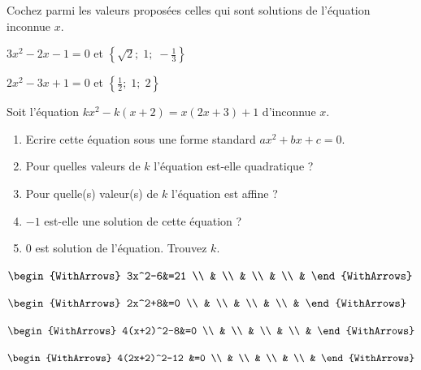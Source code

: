\documentclass[main.tex]{subfiles}
\begin{document}
\begin{exercise}Cochez parmi les valeurs proposées celles qui sont solutions de l'équation inconnue $x$.
	
\noindent
\parbox{0.45\linewidth}{
\noindent $3x^2-2x-1=0$ et $\left\{\sqrt{2}; \; 1; \; -\frac{1}{3}\right\}$
}
\hfill
\parbox{0.45\linewidth}{
\noindent $2x^2-3x+1=0$ et $\left\{\frac{1}{2}; \; 1; \; 2\right\}$
}
\end{exercise}
\begin{exercise} Soit l'équation $kx^2-k(x+2)=x(2x+3)+1$ d'inconnue $x$.
	\begin{enumerate}[label=\alph*), leftmargin=*]
		\item Ecrire cette équation sous une forme standard $a x^2+bx + c=0$.
		\item Pour quelles valeurs de $k$ l'équation est-elle quadratique ? 	
		\item Pour quelle(s) valeur(s) de $k$ l'équation est affine ?
		\item $-1$ est-elle une solution de cette équation ?
		\item $0$ est solution de l'équation. Trouvez $k$.
	\end{enumerate}
\end{exercise}	 
%
\begin{example}  
	
\noindent
\parbox{0.20\linewidth}{
	\noindent
	$\begin{WithArrows}
		3x^2-6&=21  \\
		&    \\
		&  \\
		&  \\
		&  
	\end{WithArrows}$
} 
\parbox{0.20\linewidth}{
	\noindent
	$\begin{WithArrows}
		2x^2+8&=0 \\
		&  \\
		&  \\
		&   \\
		&  
	\end{WithArrows}$
}  
\parbox{0.30\linewidth}{
	\noindent
	$\begin{WithArrows}
		4(x+2)^2-8&=0 \\
		&  \\
		&  \\
		& \\
		&   
	\end{WithArrows}$
} 	 
\parbox{0.30\linewidth}{
\noindent
$\begin{WithArrows}
	4(2x+2)^2-12 &=0 \\
	&  \\
	&  \\
	&  \\
	&   
\end{WithArrows}$
} 	
\end{example}	 
\end{document}
